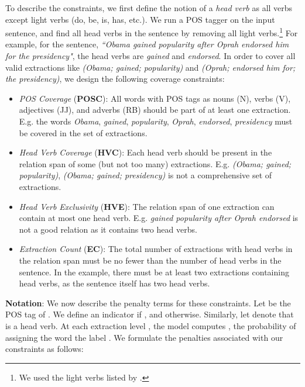 \documentclass[11pt,a4paper]{article}
\begin{document}
To describe the constraints, we first define the notion of a \emph{head verb} as all verbs except light verbs (do, be, is, has, etc.). We run a POS tagger on the input sentence, and find all head verbs in the sentence by removing all light verbs.\footnote{We used the light verbs listed by \citet{jain&al16}.}  For example, for the sentence, \textit{``Obama gained popularity after Oprah endorsed him for the presidency"}, the head verbs are \textit{gained} and \textit{endorsed}. In order to cover all 
valid
extractions like \textit{(Obama; gained; popularity)} and \textit{(Oprah; endorsed him for; the presidency)}, we design the following coverage constraints: 



\begin{itemize}
\item \textit{POS Coverage} (\textbf{POSC}): All words with POS tags as nouns (N), verbs (V), adjectives (JJ), and adverbs (RB) should be part of at least one extraction. 
E.g. the words \textit{Obama}, \textit{gained}, \textit{popularity}, \textit{Oprah}, \textit{endorsed}, \textit{presidency} must be covered in the set of extractions.

\item \textit{Head Verb Coverage} (\textbf{HVC}): Each head verb 
should be present in the relation span of some (but not too many) extractions.
E.g. \textit{(Obama; gained; popularity)}, \textit{(Obama; gained; presidency)} is not a comprehensive set of extractions.


\item \textit{Head Verb Exclusivity} (\textbf{HVE}): The relation span of one extraction can contain at most one head verb.
E.g. \textit{gained popularity after Oprah endorsed} is not a good relation as it contains two head verbs.

\item \textit{Extraction Count} (\textbf{EC}): The total number of extractions with head verbs in the relation span must be no fewer than the number of head verbs in the sentence.
In the example, there must be at least two extractions containing head verbs, as the sentence itself has two head verbs.
\end{itemize}

\noindent\textbf{Notation}: We now describe the penalty terms for these constraints. Let  be the POS tag of . We define an indicator  if , and  otherwise. Similarly, let  denote that  is a head verb. At each extraction level , the model computes , the probability of assigning the  word the label .  We formulate the penalties associated with our constraints as follows:
\end{document}
